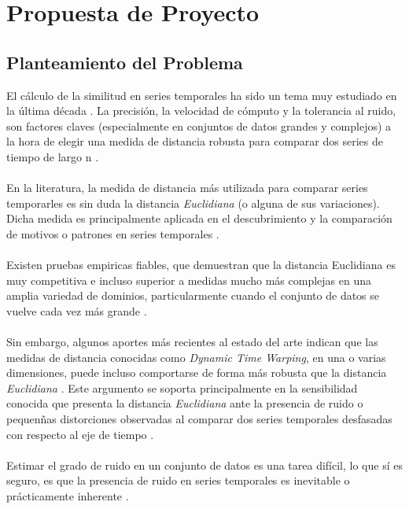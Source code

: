 \section{\textbf{Propuesta de Proyecto}}
\subsection{Planteamiento del Problema}
El c\'alculo de la similitud en series temporales ha sido un tema muy estudiado en la \'ultima d\'ecada \cite{rulediscovery}. La precisi\'on, la velocidad de c\'omputo y la tolerancia al ruido, son factores claves (especialmente en conjuntos de datos grandes y complejos) a la hora de elegir una medida de distancia robusta para comparar dos series de tiempo de largo n \cite{multidimensional}.\\\\
En la literatura, la medida de distancia m\'as utilizada para comparar series temporarles es sin duda la distancia \textit{Euclidiana} (o alguna de sus variaciones). Dicha medida es principalmente aplicada en el descubrimiento y la comparaci\'on de motivos o patrones en series temporales \cite{motifs}\cite{patterns}.\\\\
Existen pruebas empiricas fiables, que demuestran que la distancia Euclidiana es muy competitiva e incluso superior a medidas mucho m\'as complejas en una amplia variedad de dominios, particularmente cuando el conjunto de datos se vuelve cada vez m\'as grande \cite{distancecomparison}\cite{timewarpingindexing}.\\\\
Sin embargo, algunos aportes m\'as recientes al estado del arte indican que las medidas de distancia conocidas como \textit{Dynamic Time Warping}, en una o varias dimensiones, puede incluso comportarse de forma m\'as robusta que la distancia \textit{Euclidiana} \cite{keogh}. Este argumento se soporta principalmente en la sensibilidad conocida que presenta la distancia \textit{Euclidiana} ante la presencia de ruido o pequen\~nas distorciones observadas al comparar dos series temporales desfasadas con respecto al eje de tiempo \cite{DTWcubicsplineinterpolation}.\\\\
Estimar el grado de ruido en un conjunto de datos es una tarea dif\'icil, lo que s\'i es seguro, es que la presencia de ruido en series temporales es inevitable o pr\'acticamente inherente \cite{noise}.\\\\
